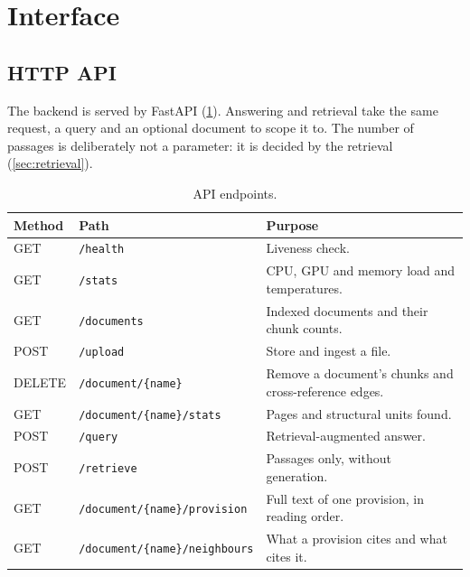 \section{Interface}
\label{sec:interface}

\subsection{HTTP API}

The backend is served by FastAPI (\cref{tab:api}). Answering and retrieval
take the same request, a query and an optional document to scope it to. The
number of passages is deliberately not a parameter: it is decided by the
retrieval (\cref{sec:retrieval}).

\begin{table}[ht]
\centering
\small
\begin{tabularx}{\textwidth}{@{}llX@{}}
\toprule
Method & Path & Purpose \\
\midrule
GET    & \texttt{/health}                     & Liveness check. \\
GET    & \texttt{/stats}                      & CPU, GPU and memory load and
                                                temperatures. \\
GET    & \texttt{/documents}                  & Indexed documents and their
                                                chunk counts. \\
POST   & \texttt{/upload}                     & Store and ingest a file. \\
DELETE & \texttt{/document/\{name\}}          & Remove a document's chunks and
                                                cross-reference edges. \\
GET    & \texttt{/document/\{name\}/stats}    & Pages and structural units
                                                found. \\
POST   & \texttt{/query}                      & Retrieval-augmented answer. \\
POST   & \texttt{/retrieve}                   & Passages only, without
                                                generation. \\
GET    & \texttt{/document/\{name\}/provision}  & Full text of one provision,
                                                in reading order. \\
GET    & \texttt{/document/\{name\}/neighbours} & What a provision cites and
                                                what cites it. \\
\bottomrule
\end{tabularx}
\caption{API endpoints.}
\label{tab:api}
\end{table}

